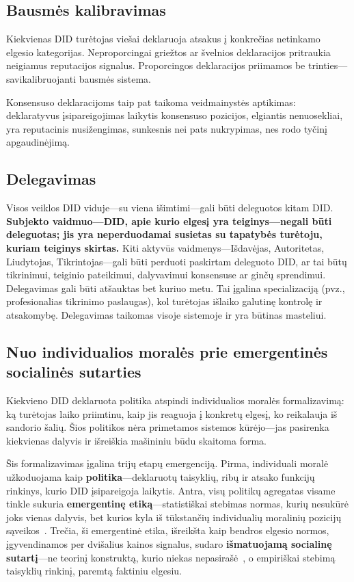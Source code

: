 \documentclass[11pt,a4paper,twocolumn]{article}
\begin{document}
\subsection{Bausmės kalibravimas}

Kiekvienas DID turėtojas viešai deklaruoja atsakus į konkrečias netinkamo elgesio kategorijas. Neproporcingai griežtos ar švelnios deklaracijos pritraukia neigiamus reputacijos signalus. Proporcingos deklaracijos priimamos be trinties---savikalibruojanti bausmės sistema.

Konsensuso deklaracijoms taip pat taikoma veidmainystės aptikimas: deklaratyvus įsipareigojimas laikytis konsensuso pozicijos, elgiantis nenuosekliai, yra reputacinis nusižengimas, sunkesnis nei pats nukrypimas, nes rodo tyčinį apgaudinėjimą.

\subsection{Delegavimas}

Visos veiklos DID viduje---su viena išimtimi---gali būti deleguotos kitam DID. \textbf{Subjekto vaidmuo---DID, apie kurio elgesį yra teiginys---negali būti deleguotas; jis yra neperduodamai susietas su tapatybės turėtoju, kuriam teiginys skirtas.} Kiti aktyvūs vaidmenys---Išdavėjas, Autoritetas, Liudytojas, Tikrintojas---gali būti perduoti paskirtam deleguoto DID, ar tai būtų tikrinimui, teiginio pateikimui, dalyvavimui konsensuse ar ginčų sprendimui. Delegavimas gali būti atšauktas bet kuriuo metu. Tai įgalina specializaciją (pvz., profesionalias tikrinimo paslaugas), kol turėtojas išlaiko galutinę kontrolę ir atsakomybę. Delegavimas taikomas visoje sistemoje ir yra būtinas masteliui.

\subsection{Nuo individualios moralės prie emergentinės socialinės sutarties}

Kiekvieno DID deklaruota politika atspindi individualios moralės formalizavimą: ką turėtojas laiko priimtinu, kaip jis reaguoja į konkretų elgesį, ko reikalauja iš sandorio šalių. Šios politikos nėra primetamos sistemos kūrėjo---jas pasirenka kiekvienas dalyvis ir išreiškia mašininiu būdu skaitoma forma.

Šis formalizavimas įgalina trijų etapų emergenciją. Pirma, individuali moralė užkoduojama kaip \textbf{politika}---deklaruotų taisyklių, ribų ir atsako funkcijų rinkinys, kurio DID įsipareigoja laikytis. Antra, visų politikų agregatas visame tinkle sukuria \textbf{emergentinę etiką}---statistiškai stebimas normas, kurių nesukūrė joks vienas dalyvis, bet kurios kyla iš tūkstančių individualių moralinių pozicijų sąveikos~\cite{durkheim1893}. Trečia, ši emergentinė etika, išreikšta kaip bendros elgesio normos, įgyvendinamos per dvišalius kainos signalus, sudaro \textbf{išmatuojamą socialinę sutartį}---ne teorinį konstruktą, kurio niekas nepasirašė~\cite{rawls1971}, o empiriškai stebimą taisyklių rinkinį, paremtą faktiniu elgesiu.
\end{document}

